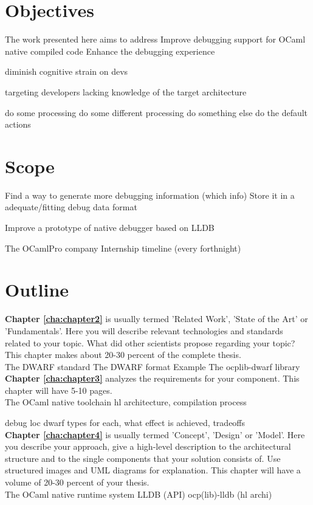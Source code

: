 \section{Objectives\label{sec:objective}}
The work presented here aims to address
Improve debugging support for OCaml native compiled code
Enhance the debugging experience

diminish cognitive strain on devs

targeting developers lacking knowledge of the target architecture

\begin{algorithmic}[1]
	\State do some processing
	\State do some different processing
	\State do something else
	\Else
	\State do the default actions
	\EndIf
\end{algorithmic}

\section{Scope\label{sec:scope}}

Find a way to generate more debugging information (which info)
Store it in a adequate/fitting debug data format

Improve a prototype of native debugger based on LLDB

The OCamlPro company
Internship timeline (every forthnight)

\section{Outline\label{sec:outline}}

\textbf{Chapter \ref{cha:chapter2}} is usually termed 'Related Work', 'State of the Art' or 'Fundamentals'. Here you will describe relevant technologies and standards related to your topic. What did other scientists propose regarding your topic? This chapter makes about 20-30 percent of the complete thesis.
\\
The DWARF standard
The DWARF format
Example
The ocplib-dwarf library
\\
\textbf{Chapter \ref{cha:chapter3}} analyzes the requirements for your component. This chapter will have 5-10 pages.
\\
The OCaml native toolchain
hl architecture, compilation process

debug loc
dwarf
types
for each, what effect is achieved, tradeoffs
\\
\textbf{Chapter \ref{cha:chapter4}} is usually termed 'Concept', 'Design' or 'Model'. Here you describe your approach, give a high-level description to the architectural structure and to the single components that your solution consists of. Use structured images and UML diagrams for explanation. This chapter will have a volume of 20-30 percent of your thesis.
\\
The OCaml native runtime system
LLDB (API)
ocp(lib)-lldb (hl archi)

